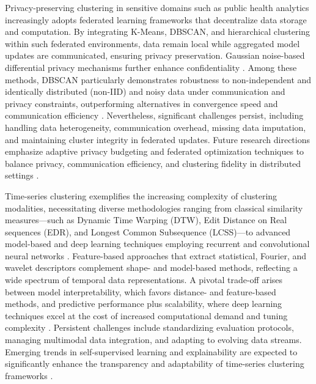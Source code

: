 \documentclass[11pt]{article}
\begin{document}
Privacy-preserving clustering in sensitive domains such as public health analytics increasingly adopts federated learning frameworks that decentralize data storage and computation. By integrating K-Means, DBSCAN, and hierarchical clustering within such federated environments, data remain local while aggregated model updates are communicated, ensuring privacy preservation. Gaussian noise-based differential privacy mechanisms further enhance confidentiality \cite{ref22}. Among these methods, DBSCAN particularly demonstrates robustness to non-independent and identically distributed (non-IID) and noisy data under communication and privacy constraints, outperforming alternatives in convergence speed and communication efficiency \cite{ref22}. Nevertheless, significant challenges persist, including handling data heterogeneity, communication overhead, missing data imputation, and maintaining cluster integrity in federated updates. Future research directions emphasize adaptive privacy budgeting and federated optimization techniques to balance privacy, communication efficiency, and clustering fidelity in distributed settings \cite{ref22}.

Time-series clustering exemplifies the increasing complexity of clustering modalities, necessitating diverse methodologies ranging from classical similarity measures—such as Dynamic Time Warping (DTW), Edit Distance on Real sequences (EDR), and Longest Common Subsequence (LCSS)—to advanced model-based and deep learning techniques employing recurrent and convolutional neural networks \cite{ref23}. Feature-based approaches that extract statistical, Fourier, and wavelet descriptors complement shape- and model-based methods, reflecting a wide spectrum of temporal data representations. A pivotal trade-off arises between model interpretability, which favors distance- and feature-based methods, and predictive performance plus scalability, where deep learning techniques excel at the cost of increased computational demand and tuning complexity \cite{ref23}. Persistent challenges include standardizing evaluation protocols, managing multimodal data integration, and adapting to evolving data streams. Emerging trends in self-supervised learning and explainability are expected to significantly enhance the transparency and adaptability of time-series clustering frameworks \cite{ref23}.
\end{document}
